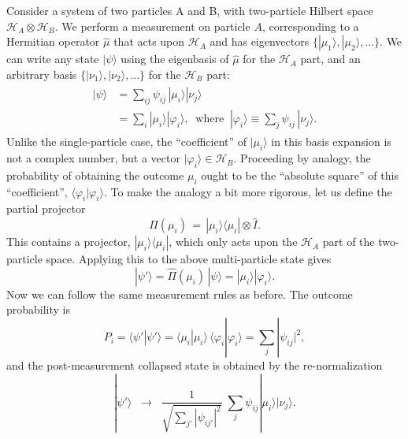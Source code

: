 \documentclass[pra,12pt]{revtex4}
\begin{document}
Consider a system of two particles A and B, with two-particle Hilbert
space $\mathscr{H}_A \otimes \mathscr{H}_B$.  We perform a measurement
on particle $A$, corresponding to a Hermitian operator $\hat{\mu}$
that acts upon $\mathscr{H}_A$ and has eigenvectors $\{|\mu_1\rangle,
|\mu_2\rangle,\dots\}$.  We can write any state $|\psi\rangle$ using
the eigenbasis of $\hat{\mu}$ for the $\mathscr{H}_A$ part, and an
arbitrary basis $\{|\nu_1\rangle, |\nu_2\rangle,\dots\}$ for the
$\mathscr{H}_B$ part:
\begin{align}
  \begin{aligned}|\psi\rangle &= \sum_{ij} \psi_{ij}\, |\mu_i\rangle |\nu_j\rangle \\&= \sum_i |\mu_i\rangle |\varphi_i\rangle, \;\;\mathrm{where}\;\;|\varphi_i\rangle\equiv \sum_j \psi_{ij}\,|\nu_j\rangle.\end{aligned}
\end{align}
Unlike the single-particle case, the ``coefficient'' of
$|\mu_i\rangle$ in this basis expansion is not a complex number, but a
vector $|\varphi_i\rangle \in \mathscr{H}_B$.  Proceeding by analogy,
the probability of obtaining the outcome $\mu_i$ ought to be the
``absolute square'' of this ``coefficient'',
$\langle\varphi_i|\varphi_i\rangle$.  To make the analogy a bit more
rigorous, let us define the partial projector
\begin{equation}
  \hat{\Pi}(\mu_i) \,=\, |\mu_i\rangle\langle \mu_i| \otimes  \hat{I}.
\end{equation}
This contains a projector, $|\mu_i\rangle\langle \mu_i|$, which only
acts upon the $\mathscr{H}_A$ part of the two-particle space.
Applying this to the above multi-particle state gives
\begin{equation}
  |\psi'\rangle = \hat{\Pi}(\mu_i)\, |\psi\rangle
  = |\mu_i\rangle |\varphi_i\rangle.
\end{equation}
Now we can follow the same measurement rules as before.  The outcome
probability is
\begin{equation}
  P_i = \langle\psi'|\psi'\rangle = \langle \mu_i|\mu_i\rangle\, \langle \varphi_i|\varphi_i\rangle = \sum_j |\psi_{ij}|^2,
\end{equation}
and the post-measurement collapsed state is obtained by the
re-normalization
\begin{equation}
  |\psi'\rangle
 \;\;\rightarrow\;\;
 \frac{1}{\sqrt{\sum_{j'} |\psi_{ij'}|^2}}\;
 \sum_{j} \psi_{ij} |\mu_i\rangle |\nu_j\rangle.
\end{equation}
\end{document}
